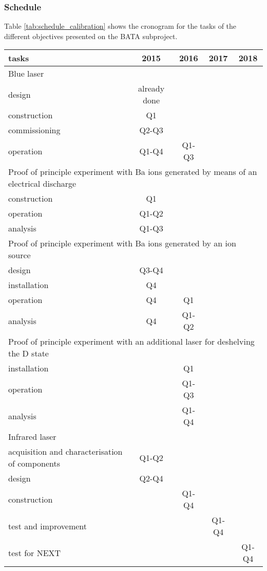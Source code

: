 

\subsubsection*{Schedule}

Table \ref{tab:schedule_calibration} shows the cronogram for the tasks of the different objectives presented on the  BATA subproject.

\begin{center}
\begin{tabular}{| l | c | c | c | c |}
\hline
tasks & 2015 & 2016 & 2017 & 2018 \\
\hline
\hline
\multicolumn{5}{|l|}{Blue laser}  \\
\hline
\hline
design & already done & & &  \\
construction & Q1 & & & \\
commissioning & Q2-Q3& & & \\
operation &  Q1-Q4 & Q1-Q3 & & \\
\hline
\hline
\multicolumn{5}{|l|}{Proof of principle experiment with Ba ions generated by means of an electrical discharge}  \\
\hline
\hline
construction  &  Q1 & & & \\
operation &  Q1-Q2 & & & \\
analysis &  Q1-Q3 & & & \\
\hline
\hline
\multicolumn{5}{|l|}{Proof of principle experiment with Ba ions generated by an ion source}  \\
\hline
\hline
design & Q3-Q4 & & &  \\
installation  &  Q4 & & & \\
operation &  Q4 & Q1 & & \\
analysis &  Q4 & Q1-Q2 & & \\
\hline
\hline
\multicolumn{5}{|l|}{Proof of principle experiment with an additional laser for deshelving the D state}  \\
\hline
\hline
installation  &  & Q1 & & \\
operation &  & Q1-Q3 & & \\
analysis &  & Q1-Q4 & & \\
\hline
\hline
\multicolumn{5}{|l|}{Infrared laser}  \\
\hline
\hline
acquisition and characterisation of components  & Q1-Q2 & & &  \\
design  & Q2-Q4  & & & \\
construction &  & Q1-Q4 & & \\
test and improvement &  & & Q1-Q4 & \\
test for NEXT & & &  & Q1-Q4\\
\hline
\end{tabular}
\label{tab:schedule_calibration}
\end{center}
